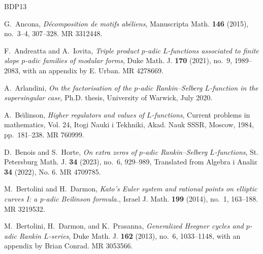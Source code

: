 \documentclass[11pt, a4paper, reqno]{amsart}
\theoremstyle{definition}
\theoremstyle{plain}
\theoremstyle{remark}
\begin{document}
\providecommand{\bysame}{\leavevmode\hbox to3em{\hrulefill}\thinspace}
\providecommand{\MR}[1]{}
\renewcommand{\MR}[1]{%
 MR \href{http://www.ams.org/mathscinet-getitem?mr=#1}{#1}.
}
\providecommand{\href}[2]{#2}
\newcommand{\articlehref}[2]{\href{#1}{#2}}
\begin{thebibliography}{BDP13}

G.~Ancona,
  \articlehref{http://doi.org/10.1007/s00229-014-0708-4}{\emph{D{\'e}composition
  de motifs ab{\'e}liens}}, Manuscripta Math. \textbf{146} (2015), no.~3--4,
  307--328. \MR{3312448}

F.~Andreatta and A.~Iovita,
  \articlehref{http://doi.org/10.1215/00127094-2020-0076}{\emph{Triple
  product {$p$}-adic {$L$}-functions associated to finite slope {$p$}-adic
  families of modular forms}}, Duke Math. J. \textbf{170} (2021), no.~9,
  1989--2083, with an appendix by E. Urban. \MR{4278669}

A.~Arlandini,
  \articlehref{http://webcat.warwick.ac.uk/record=b3518293~S15}{\emph{On the
  factorisation of the {$p$}-adic {R}ankin--{S}elberg {$L$}-function in the
  supersingular case}}, Ph.D. thesis, University of Warwick, July 2020.

A.~Be{\u\i}linson,
  \articlehref{http://doi.org/10.1007/BF02105861}{\emph{Higher regulators
  and values of {$L$}-functions}}, Current problems in mathematics, {V}ol. 24,
  Itogi Nauki i Tekhniki, Akad. Nauk SSSR, Moscow, 1984, pp.~181--238.
  \MR{760999}

D.~Benois and S.~Horte,
  \articlehref{http://doi.org/10.1090/spmj/1785}{\emph{On extra zeros of
  {$p$}-adic {R}ankin--{S}elberg {$L$}-functions}}, St. Petersburg Math. J.
  \textbf{34} (2023), no.~6, 929--989, Translated from Algebra i Analiz {\bf
  34} (2022), No. 6. \MR{4709785}

M.~Bertolini and H.~Darmon,
  \articlehref{http://doi.org/10.1007/s11856-013-0047-2}{\emph{Kato's
  {E}uler system and rational points on elliptic curves {I}: a p-adic
  {B}eilinson formula.}}, Israel J. Math. \textbf{199} (2014), no.~1, 163--188.
  \MR{3219532}

M.~Bertolini, H.~Darmon, and K.~Prasanna,
  \articlehref{http://doi.org/10.1215/00127094-2142056}{\emph{Generalized
  {H}eegner cycles and {$p$}-adic {R}ankin {$L$}-series}}, Duke Math. J.
  \textbf{162} (2013), no.~6, 1033--1148, with an appendix by Brian Conrad.
  \MR{3053566}


\end{thebibliography}
\end{document}
